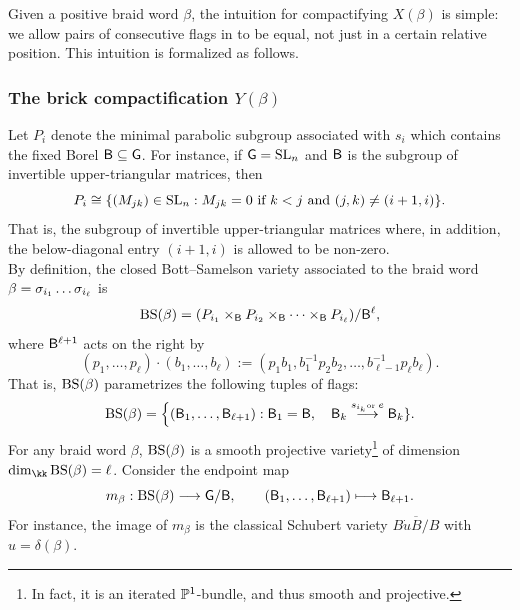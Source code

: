 \noindent Given a positive braid word $\beta$, the intuition for compactifying $X(\beta)$ is simple: we allow pairs of consecutive flags in  to be equal, not just in a certain relative position. This intuition is formalized as follows.

\subsubsection{The brick compactification $Y(\beta)$}\label{sssec:brick_compactification} Let \(P_i\) denote the minimal parabolic subgroup associated with
\(s_i\) which contains the fixed Borel $\mathsf{B}\subseteq\mathsf{G}$. For instance, if $\mathsf{G}=\operatorname{SL}_n$ and $\mathsf{B}$ is the subgroup of invertible upper-triangular matrices, then
$$P_i\cong\{(M_{jk})\in\operatorname{SL}_n: M_{jk}=0\mbox{ if }k<j\mbox{ and }(j,k)\neq(i+1,i)\}.$$
That is, the subgroup of invertible upper-triangular matrices where, in addition, the below-diagonal entry $(i+1,i)$ is allowed to be non-zero.\\

By definition, the closed Bott--Samelson variety associated to the braid word $\beta=\sigma_{i_1}\ldots\sigma_{i_{\ell}}$ is
\begin{equation}\label{eq:BSquotient}
 \operatorname{BS}(\beta)=(P_{i_1}\times_{\mathsf{B}} P_{i_2}\times_{\mathsf{B}}\cdots\times_{\mathsf{B}} P_{i_{\ell}})/\mathsf{B}^{\ell},
\end{equation}
where $\mathsf{B}^{\ell+1}$ acts on the right by
$$(p_1,\ldots,p_{\ell})\cdot (b_1,\ldots,b_{\ell}):=(p_1b_1,b_1^{-1}p_2b_2,\ldots,b_{\ell-1}^{-1}p_{\ell} b_{\ell}).$$
That is, $\operatorname{BS}(\beta)$ parametrizes the following tuples of flags:
\begin{equation}\label{eq:BSgallery}
 \BS(\beta)=\Bigl\{(\borel_1,\ldots,\borel_{\ell+1}):
 \borel_1=\borel,\quad \borel_{k} \buildrel s_{i_{k}}\mbox{\tiny or }e \over \longrightarrow \borel_{k}\}.
\end{equation}
For any braid word $\beta$, $\operatorname{BS}(\beta)$ is a smooth projective variety\footnote{In fact, it is an iterated $\mathbb{P}^1$-bundle, and thus smooth and projective.} of dimension $\dim_\kk\BS(\beta)=\ell$. Consider the endpoint map
\begin{equation}\label{eq:endpoint}
  m_\beta:\operatorname{BS}(\beta)\longrightarrow \mathsf{G}/\mathsf{B},
  \qquad (\mathsf{B}_1,\ldots,\mathsf{B}_{\ell+1})\longmapsto \mathsf{B}_{\ell+1}.
\end{equation}
For instance, the image of $m_\beta$ is the classical Schubert variety $\overline{B\dot uB/B}$ with $u=\delta(\beta)$.

